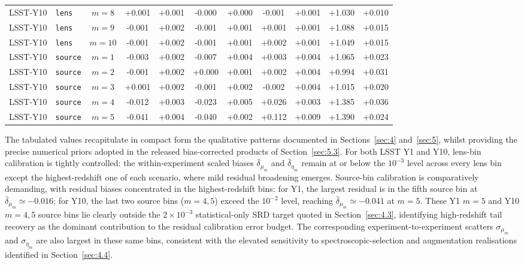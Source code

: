 \begin{table}
\begin{threeparttable}
\begin{tabular}{llccccccccc}
      LSST-Y10 & \texttt{lens} & \(m=8\)  & +0.001 & +0.001 & -0.000 & +0.000 & -0.001 & +0.001 & +1.030 & +0.010 \\
      LSST-Y10 & \texttt{lens} & \(m=9\)  & -0.001 & +0.002 & -0.001 & +0.001 & +0.001 & +0.001 & +1.088 & +0.015 \\
      LSST-Y10 & \texttt{lens} & \(m=10\) & -0.001 & +0.002 & -0.001 & +0.001 & +0.002 & +0.001 & +1.049 & +0.015 \\
      \midrule
      LSST-Y10 & \texttt{source} & \(m=1\) & -0.003 & +0.002 & -0.007 & +0.004 & +0.003 & +0.004 & +1.065 & +0.023 \\
      LSST-Y10 & \texttt{source} & \(m=2\) & -0.001 & +0.002 & +0.000 & +0.001 & +0.002 & +0.004 & +0.994 & +0.031 \\
      LSST-Y10 & \texttt{source} & \(m=3\) & +0.001 & +0.002 & -0.001 & +0.002 & -0.002 & +0.004 & +1.015 & +0.020 \\
      LSST-Y10 & \texttt{source} & \(m=4\) & -0.012 & +0.003 & -0.023 & +0.005 & +0.026 & +0.003 & +1.385 & +0.036 \\
      LSST-Y10 & \texttt{source} & \(m=5\) & -0.041 & +0.004 & -0.040 & +0.002 & +0.112 & +0.009 & +1.390 & +0.024 \\
      \bottomrule
    \end{tabular}
  \end{threeparttable}
\end{table}

The tabulated values recapitulate in compact form the qualitative patterns documented in Sections~\ref{sec:4} and~\ref{sec:5}, whilst providing the precise numerical priors adopted in the released bias-corrected products of Section~\ref{sec:5.3}. For both LSST Y1 and Y10, lens-bin calibration is tightly controlled: the within-experiment scaled biases \(\bar{\delta}_{\mu_m}\) and \(\bar{\delta}_{\eta_m}\) remain at or below the \(10^{-3}\) level across every lens bin except the highest-redshift one of each scenario, where mild residual broadening emerges. Source-bin calibration is comparatively demanding, with residual biases concentrated in the highest-redshift bins: for Y1, the largest residual is in the fifth source bin at \(\bar{\delta}_{\mu_m}\simeq-0.016\); for Y10, the last two source bins (\(m=4,5\)) exceed the \(10^{-2}\) level, reaching \(\bar{\delta}_{\mu_m}\simeq-0.041\) at \(m=5\). These Y1 \(m=5\) and Y10 \(m=4,5\) source bins lie clearly outside the \(2\times 10^{-3}\) statistical-only SRD target quoted in Section~\ref{sec:4.3}, identifying high-redshift tail recovery as the dominant contribution to the residual calibration error budget. The corresponding experiment-to-experiment scatters \(\sigma_{\mu_m}\) and \(\sigma_{\eta_m}\) are also largest in these same bins, consistent with the elevated sensitivity to spectroscopic-selection and augmentation realisations identified in Section~\ref{sec:4.4}.

